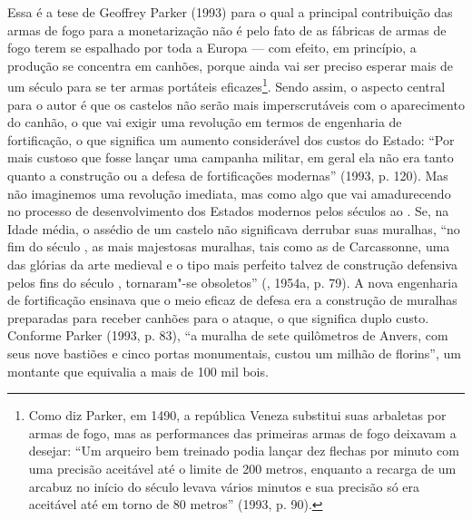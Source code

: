 Essa é a tese de Geoffrey Parker (1993) para o qual a principal
contribuição das armas de fogo para a monetarização não é pelo fato de
as fábricas de armas de fogo terem se espalhado por toda a Europa --- com
efeito, em princípio, a produção se concentra em canhões, porque ainda
vai ser preciso esperar mais de um século para se ter armas portáteis
eficazes\footnote{Como diz Parker, em 1490, a república Veneza substitui
  suas arbaletas por armas de fogo, mas as performances das primeiras
  armas de fogo deixavam a desejar: ``Um arqueiro bem treinado podia
  lançar dez flechas por minuto com uma precisão aceitável até o limite
  de 200 metros, enquanto a recarga de um arcabuz no início do século
   levava vários minutos e sua precisão só era aceitável até em torno
  de 80 metros'' (1993, p. 90).}. Sendo assim, o aspecto central para o
autor é que os castelos não serão mais imperscrutáveis com o
aparecimento do canhão, o que vai exigir uma revolução em termos de
engenharia de fortificação, o que significa um aumento considerável dos
custos do Estado: ``Por mais custoso que fosse lançar uma campanha
militar, em geral ela não era tanto quanto a construção ou a defesa de
fortificações modernas'' (1993, p. 120). Mas não imaginemos uma
revolução imediata, mas como algo que vai amadurecendo no processo de
desenvolvimento dos Estados modernos pelos séculos  ao . Se, na
Idade média, o assédio de um castelo não significava derrubar suas
muralhas, ``no fim do século , as mais majestosas muralhas, tais como
as de Carcassonne, uma das glórias da arte medieval e o tipo mais
perfeito talvez de construção defensiva pelos fins do século ,
tornaram"-se obsoletos'' (, 1954a, p. 79). A nova engenharia de
fortificação ensinava que o meio eficaz de defesa era a construção de
muralhas preparadas para receber canhões para o ataque, o que significa
duplo custo. Conforme Parker (1993, p. 83), ``a muralha de sete
quilômetros de Anvers, com seus nove bastiões e cinco portas
monumentais, custou um milhão de florins'', um montante que equivalia a
mais de 100 mil bois.

